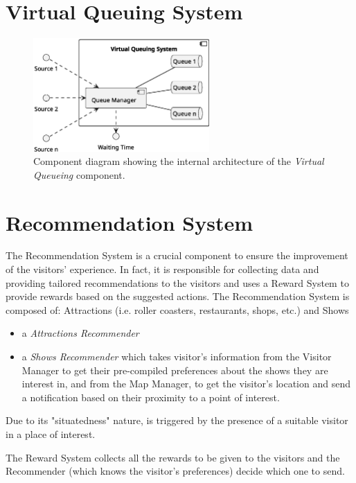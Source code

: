 \section{Virtual Queuing System}
\begin{figure}[H]
	\centering
	\includegraphics[width=0.6\textwidth]{img/virtual-queuing.eps}
	\caption{Component diagram showing the internal architecture of the \textit{Virtual Queueing} component.
	}
	\label{fig:virtual-queueing-arch}
\end{figure}

\section{Recommendation System}
The Recommendation System is a crucial component to ensure the improvement of the visitors' experience.
In fact, it is responsible for collecting data and providing tailored recommendations to the visitors
and uses a Reward System to provide rewards based on the suggested actions.
The Recommendation System is composed of:
Attractions (i.e. roller coasters, restaurants, shops, etc.) and Shows
\begin{itemize}
	\item a \textit{Attractions Recommender}
	\item a \textit{Shows Recommender} which takes visitor's information from the Visitor Manager to get their pre-compiled preferences about the shows they are interest in, and from the Map Manager, to get the visitor's location and send a notification based on their proximity to a point of interest.
\end{itemize}


Due to its "situatedness" nature, is triggered by the presence of a suitable visitor in a place of interest.

The Reward System collects all the rewards to be given to the visitors and the Recommender (which knows the visitor's preferences)
decide which one to send.

